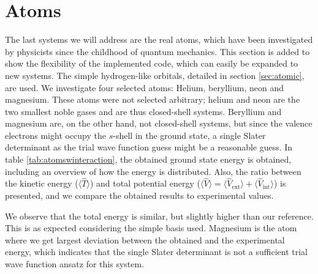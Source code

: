 \section{Atoms}\label{sec:atomsresults}
The last systems we will address are the real atoms, which have been investigated by physicists since the childhood of quantum mechanics. This section is added to show the flexibility of the implemented code, which can easily be expanded to new systems. The simple hydrogen-like orbitals, detailed in section \ref{sec:atomic}, are used. We investigate four selected atoms: Helium, beryllium, neon and magnesium. These atoms were not selected arbitrary; helium and neon are the two smallest noble gases and are thus closed-shell systems. Beryllium and magnesium are, on the other hand, not closed-shell systems, but since the valence electrons might occupy the $s$-shell in the ground state, a single Slater determinant as the trial wave function guess might be a reasonable guess. In table \eqref{tab:atomswinteraction}, the obtained ground state energy is obtained, including an overview of how the energy is distributed. Also, the ratio between the kinetic energy ($\langle\hat{T}\rangle$) and total potential energy ($\langle\hat{V}\rangle=\langle\hat{V}_{\text{ext}}\rangle+\langle\hat{V}_{\text{int}}\rangle$) is presented, and we compare the obtained results to experimental values. 

We observe that the total energy is similar, but slightly higher than our reference. This is as expected considering the simple basis used. Magnesium is the atom where we get largest deviation between the obtained and the experimental energy, which indicates that the single Slater determinant is not a sufficient trial wave function ansatz for this system.

